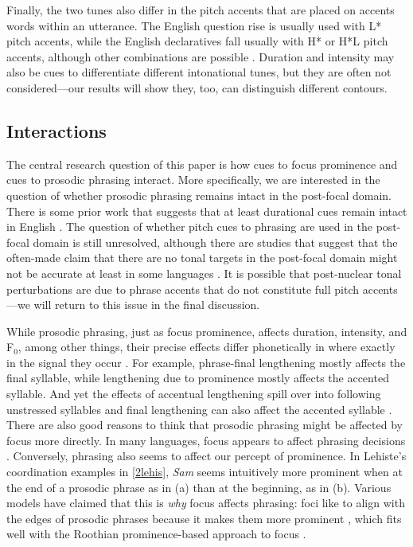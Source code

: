 \documentclass[preprint,review,12pt,authoryear,times]{elsarticle}
\begin{document}
Finally, the two tunes also differ in the pitch accents that are placed on accents words within an utterance. The English question rise is usually used with L* pitch accents, while the English declaratives fall usually with H* or H*L pitch accents, although other combinations are possible \citep{pierr90}. Duration and intensity may also be cues to differentiate different intonational tunes, but they are often not considered---our results will show they, too, can distinguish different contours. 


\subsection{Interactions}

The central research question of this paper is how cues to focus prominence and cues to prosodic phrasing interact. More specifically, we are interested in the question of whether prosodic phrasing remains intact in the post-focal domain.  There is some prior work that suggests that at least durational cues remain intact \citep{norcl05} in English \citep[see][for relevant results in other languages]{jun00, sugah03, ishih03, ishih16, kugle17}.  The question of whether pitch cues to phrasing are used in the post-focal domain is still unresolved, although  there are studies that suggest that the often-made claim that there are no tonal targets in the post-focal domain might not be accurate at least in some languages \citep{xu05,  kugle17}. It is possible that  post-nuclear tonal perturbations are due to phrase accents that do not constitute full pitch accents---we will return to this issue in the final discussion.

While prosodic phrasing, just as focus prominence, affects duration, intensity, and F$_0$, among other things, their precise effects differ phonetically in where exactly in the signal they occur \citep{edwar91, beckm92b, cho09, cho11}. For example, phrase-final lengthening mostly affects the final syllable, while lengthening due to prominence mostly affects the accented syllable. And yet the effects of accentual lengthening spill over into following unstressed syllables \citep{turk97} and final lengthening can also affect the accented syllable \citep{turk07}. There are also good reasons to think that prosodic phrasing might be affected by focus more directly. In many languages, focus appears to affect phrasing decisions \citep[][and references therein]{fery13}. Conversely, phrasing also seems to affect our percept of prominence. In Lehiste's coordination examples in \ref{2lehis}, {\em Sam} seems intuitively more prominent when at the end of a prosodic phrase as in (a) than at the beginning, as in (b). Various models have claimed that this is {\em why} focus affects phrasing: foci like to align with the edges of prosodic phrases because it makes them more prominent \citep{truck99,burin10typology}, which fits well with the Roothian prominence-based approach to focus \citep[but see][for a different perspective]{fery13}.  
\end{document}
